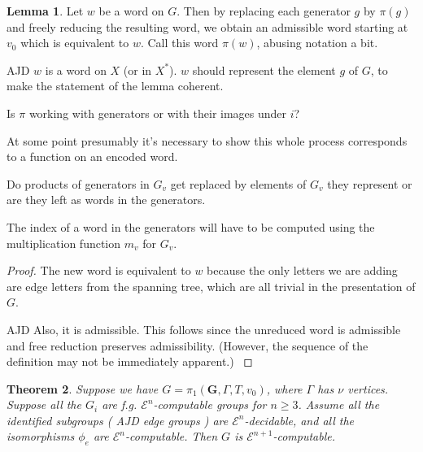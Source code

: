 \documentclass[a4paper]{article}
\newcommand{\grz}[1]{$\mathcal{E}^{#1}$}	%
\newcommand{\fgoagog}{\pi_1(\mathbf{G},\Gamma,T,v_0)}					%
\theoremstyle{plain}
\newtheorem{theorem}{Theorem}[section]
\theoremstyle{definition}
\newtheorem{lemma}[theorem]{Lemma}
\newenvironment{ad}{\noindent\color{green} AJD }{}
\newcommand{\ajd}[1]{
\begin{ad} #1 \end{ad}}
\begin{document}
\begin{lemma}
Let $w$ be a word on $G$. Then by replacing each generator $g$ by $\pi(g)$ and freely reducing the resulting word, we obtain an admissible word starting at $v_0$ which is equivalent to $w$. Call this word $\pi(w)$, abusing notation a bit.
\end{lemma}
\ajd{$w$ is a word on $X$ (or in $X^\ast$). $w$ should represent the
element $g$ of $G$, to make the statement of the lemma coherent.

Is $\pi$ working with generators or with their images under $i$? 

At some point presumably it's necessary to show this whole process
corresponds to a function on an encoded word.

Do
products of generators in $G_v$ get replaced by elements of $G_v$ they
represent or are they left as words in the generators. 

The index of a word
in the generators will have to be computed using the multiplication function
$m_v$ for $G_v$.}
\begin{proof}
The new word is equivalent to $w$ because the only letters we are adding are edge letters from the spanning tree, which are all trivial in the presentation of $G$.
\ajd{Also, it is admissible. This follows since the unreduced word is
admissible and free reduction preserves admissibility. (However, the 
sequence of the definition may not be immediately apparent.)}
\end{proof}


\begin{theorem} \label{fgoagogcomp}
Suppose we have $G = \fgoagog$, where $\Gamma$ has $\nu$ vertices. Suppose all the $G_i$ are f.g. \grz{n}-computable groups for $n \geq 3$. Assume all the identified subgroups (\ajd{edge groups}) are \grz{n}-decidable, and all the isomorphisms $\phi_e$ are \grz{n}-computable. Then $G$ is \grz{n+1}-computable.
\end{theorem}
\end{document}
